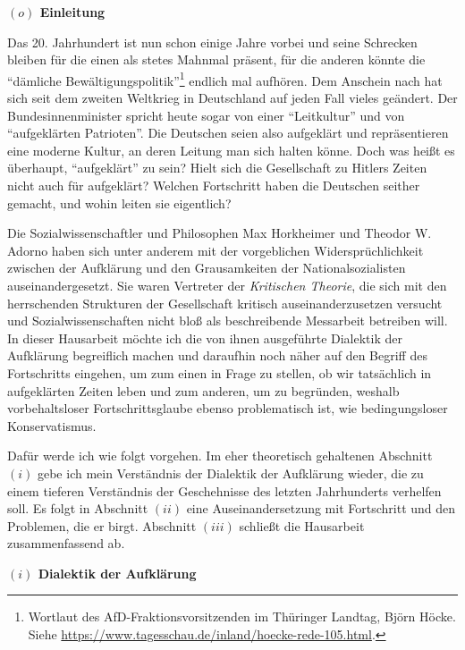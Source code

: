 \documentclass[a4paper, 12pt]{article}
\begin{document}
\begin{onehalfspace} 

\noindent\textbf{$(o)$ Einleitung}

\noindent Das 20. Jahrhundert ist nun schon einige Jahre vorbei und seine Schrecken bleiben für die einen als stetes Mahnmal präsent, für die anderen könnte die "`dämliche Bewälti\-gungs\-politik"'\footnote{Wortlaut des AfD-Fraktionsvorsitzenden im Thüringer Landtag, Björn Höcke. Siehe \url{https://www.tagesschau.de/inland/hoecke-rede-105.html}.} endlich mal aufhören. Dem Anschein nach hat sich seit dem zweiten Weltkrieg in Deutschland auf jeden Fall vieles geändert. Der Bundesinnenminister spricht heute sogar von einer "`Leitkultur"' und von "`aufgeklärten Patrioten"'. Die Deutschen seien also aufgeklärt und repräsentieren eine moderne Kultur, an deren Leitung man sich halten könne. Doch was heißt es überhaupt, "`aufgeklärt"' zu sein? Hielt sich die Gesellschaft zu Hitlers Zeiten nicht auch für aufgeklärt? Welchen Fortschritt haben die Deutschen seither gemacht, und wohin leiten sie eigentlich? 

Die Sozialwissenschaftler und Philosophen Max Horkheimer und Theodor W. Adorno haben sich unter anderem mit der vorgeblichen Widersprüchlichkeit zwischen der Aufklärung und den Grausamkeiten der Nationalsozialisten auseinandergesetzt. Sie waren Vertreter der \emph{Kritischen Theorie}, die sich mit den herrschenden Strukturen der Gesellschaft kritisch auseinanderzusetzen versucht und Sozialwissenschaften nicht bloß als beschreibende Messarbeit betreiben will. In dieser Hausarbeit möchte ich die von ihnen ausgeführte Dialektik der Aufklärung begreiflich machen und daraufhin noch näher auf den Begriff des Fortschritts eingehen, um zum einen in Frage zu stellen, ob wir tatsächlich in aufgeklärten Zeiten leben und zum anderen, um zu begründen, weshalb vorbehaltsloser Fortschrittsglaube ebenso problematisch ist, wie bedingungsloser Konservatismus.

Dafür werde ich wie folgt vorgehen. Im eher theoretisch gehaltenen Abschnitt $(i)$ gebe ich mein Verständnis der Dialektik der Aufklärung wieder, die zu einem tieferen Verständnis der Geschehnisse des letzten Jahrhunderts verhelfen soll. Es folgt in Abschnitt $(ii)$ eine Auseinandersetzung mit Fortschritt und den Problemen, die er birgt. Abschnitt $(iii)$ schließt die Hausarbeit zusammenfassend ab.

\vspace{5mm}


\noindent\textbf{$(i)$ Dialektik der Aufklärung}


\end{onehalfspace}
\end{document}
